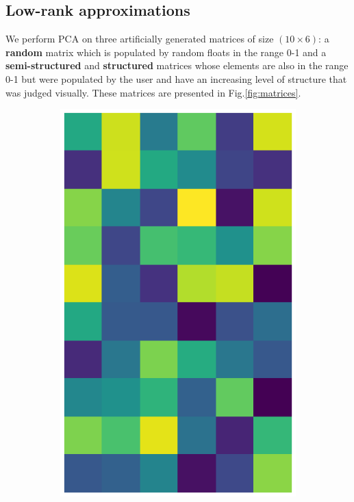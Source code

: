 \documentclass[10pt,twocolumn]{article}
\begin{document}
\subsection{Low-rank approximations}

We perform PCA on three artificially generated matrices of size $(10 \times 6)$: a \textbf{random} matrix which is populated by random floats in the range 0-1 and a \textbf{semi-structured} and \textbf{structured} matrices whose elements are also in the range 0-1 but were populated by the user and have an increasing level of structure that was judged visually. These matrices are presented in Fig.\ref{fig:matrices}.

\begin{figure}[H]
\begin{subfigure}[t]{.15\textwidth}
\centering
\includegraphics[scale=.2]{DWGs/random-matrix-original.eps}

\end{subfigure}
\end{figure}
\end{document}
